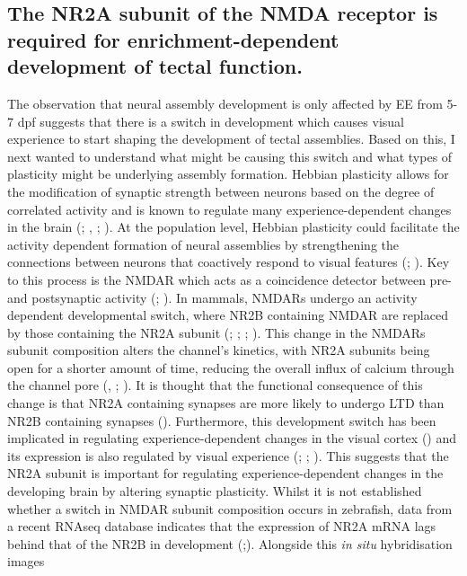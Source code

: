 \clearpage

\subsection{The NR2A subunit of the NMDA receptor is required for 
enrichment-dependent development of tectal function.}

The observation that neural assembly development is only affected by EE from 5-7 dpf suggests that there is a switch in development which causes visual experience to start shaping the development of tectal assemblies. Based on this, I next wanted to understand what might be causing this switch  and what types of plasticity might be underlying assembly formation. Hebbian plasticity allows for the modification of synaptic strength between neurons based on the degree of correlated activity and is known to regulate many experience-dependent changes in the brain (\cite{Feldman2012}; \cite{Ruthazer2003ControlVivo}, \cite{Mu2006SpikeSystem}; \cite{Fox2005ReviewSystems}). At the population level, Hebbian plasticity could facilitate the activity dependent formation of neural assemblies by strengthening the connections between neurons that coactively respond to visual features (\cite{Hebb1949}; \cite{Carrillo-Reid2016}). Key to this process is the NMDAR which acts as a coincidence detector between pre- and postsynaptic activity (\cite{Nowak1984MagnesiumNeurones}; \cite{Malenka2004LTPRiches}). In mammals, NMDARs undergo an activity dependent developmental switch, where NR2B containing NMDAR are replaced by those containing the NR2A subunit (\cite{Monyer1994DevelopmentalReceptors}; \cite{Sans2000ASynapses}; \cite{Sheng1994ChangingCortex}; \cite{Liu2004SwitchingDevelopment}). This change in the NMDARs subunit composition alters the channel's kinetics, with NR2A subunits being open for a shorter amount of time, reducing the overall influx of calcium through the channel pore (\cite{Chen1999Subtype-dependenceProbability}, \cite{Erreger2005Subunit-specificProfiles}; \cite{Sobczyk2005NMDASpines}). It is thought that the functional consequence of this change is that NR2A containing synapses are more likely to undergo LTD than NR2B containing synapses (\cite{Yashiro2008RegulationMetaplasticity}). Furthermore, this development switch has been implicated in regulating experience-dependent changes in the visual cortex  (\cite{Fagiolini2003SeparableSignaling}) and its expression is also regulated by visual experience (\cite{Philpot2001VisualCortex}; \cite{Carmignoto1992Activity-dependentCortex}; \cite{Yashiro2005VisualCortex}). This suggests that the NR2A subunit is important for regulating experience-dependent changes in the developing brain by altering synaptic plasticity.  Whilst it is not established whether a switch in NMDAR subunit composition occurs in zebrafish, data from a recent RNAseq database indicates that the expression of NR2A mRNA lags behind that of the NR2B in development (\cite{Petryszak2016ExpressionPlants};\cite{White2017AZebrafish}). Alongside this \textit{in situ} hybridisation images 